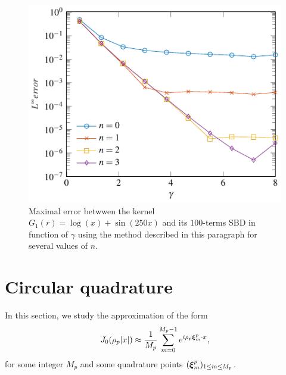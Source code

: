 \documentclass{article}
\begin{document}
\begin{figure}[H]	
	\setlength{\plotwidth}{0.7\textwidth}
	\centering
	\includegraphics[scale = 0.8]{LinfVsGamma_arbitraryKern}
	\caption{Maximal error betwwen the kernel $G_1(r) =  \log(x) + \sin(250x)$ and its $100$-terms SBD in function of $\gamma$ using the method described in this paragraph for several values of $n$.}
	\label{figArbitraryKernel}
\end{figure}																									
																														
\section{Circular quadrature}
\label{sec:circular}
In this section, we study the approximation of the form
\[ J_0(\rho_p|x|) \approx \dfrac{1}{M_p}\sum_{m=0}^{M_p-1}e^{i \rho_p \boldsymbol{\xi}^p_m \cdot x}, \]
for some integer $M_p$ and some quadrature points $(\boldsymbol{\xi}_m^p)_{1 \leq m \leq M_p}$. 
																														
\end{document}
